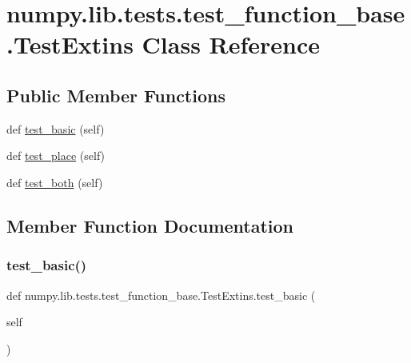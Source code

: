 \hypertarget{classnumpy_1_1lib_1_1tests_1_1test__function__base_1_1TestExtins}{}\section{numpy.\+lib.\+tests.\+test\+\_\+function\+\_\+base.\+Test\+Extins Class Reference}
\label{classnumpy_1_1lib_1_1tests_1_1test__function__base_1_1TestExtins}
\subsection*{Public Member Functions}
\begin{DoxyCompactItemize}
\item 
def \hyperlink{classnumpy_1_1lib_1_1tests_1_1test__function__base_1_1TestExtins_a02512c2f8f2655c082424947a2c5546d}{test\+\_\+basic} (self)
\item 
def \hyperlink{classnumpy_1_1lib_1_1tests_1_1test__function__base_1_1TestExtins_a928caa63c6a13efd74a45c6b8b163cee}{test\+\_\+place} (self)
\item 
def \hyperlink{classnumpy_1_1lib_1_1tests_1_1test__function__base_1_1TestExtins_a21f6726e7024905c0e9996c1a2332460}{test\+\_\+both} (self)
\end{DoxyCompactItemize}


\subsection{Member Function Documentation}
\mbox{\label{classnumpy_1_1lib_1_1tests_1_1test__function__base_1_1TestExtins_a02512c2f8f2655c082424947a2c5546d}} 
\subsubsection{\texorpdfstring{test\+\_\+basic()}{test\_basic()}}
{\footnotesize\ttfamily def numpy.\+lib.\+tests.\+test\+\_\+function\+\_\+base.\+Test\+Extins.\+test\+\_\+basic (\begin{DoxyParamCaption}\item[{}]{self }\end{DoxyParamCaption})}

